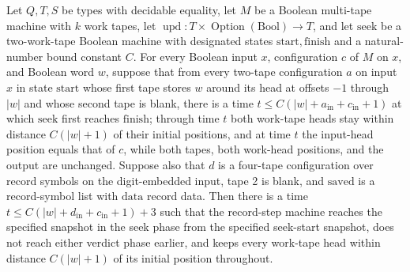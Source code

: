 \begin{theorem}
\label{Turing.recordStep_seek_read}
\leanok
{}
Let $Q,T,S$ be types with decidable equality, let $M$ be a Boolean multi-tape machine
with $k$ work tapes, let
$\operatorname{upd}:T\times\operatorname{Option}(\mathrm{Bool})\to T$, and let
$\mathrm{seek}$ be a two-work-tape Boolean machine with designated states
$\mathrm{start},\mathrm{finish}$ and a natural-number bound constant $C$. For every
Boolean input $x$, configuration $c$ of $M$ on $x$, and Boolean word $w$, suppose that
from every two-tape configuration $a$ on input $x$ in state $\mathrm{start}$ whose first
tape stores $w$ around its head at offsets $-1$ through $|w|$ and whose second tape is
blank, there is a time $t\le C(|w|+a_{\mathrm{in}}+c_{\mathrm{in}}+1)$ at which
$\mathrm{seek}$ first reaches $\mathrm{finish}$; through time $t$ both work-tape heads
stay within distance $C(|w|+1)$ of their initial positions, and at time $t$ the
input-head position equals that of $c$, while both tapes, both work-head positions, and
the output are unchanged. Suppose also that $d$ is a four-tape configuration over record
symbols on the digit-embedded input, tape 2 is blank, and $\mathrm{saved}$ is a
record-symbol list with $\mathrm{data}$ record data. Then there is a time $t\le
C(|w|+d_{\mathrm{in}}+c_{\mathrm{in}}+1)+3$ such that the record-step machine reaches
the specified snapshot in the seek phase from the specified seek-start snapshot, does
not reach either verdict phase earlier, and keeps every work-tape head within distance
$C(|w|+1)$ of its initial position throughout.
\end{theorem}

